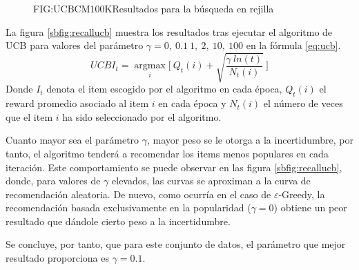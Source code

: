 \begin{figure}[Resultados de la búsqueda en rejilla para UCB]{FIG:UCBCM100K}{Resultados para la búsqueda en rejilla}
   \quad
\end{figure}

La figura \ref{sbfig:recallucb} muestra los resultados tras ejecutar el algoritmo de UCB para valores del parámetro $\gamma = 0, \ 0.1 \ 1, \ 2, \ 10, \ 100$ en la fórmula \ref{eq:ucb}. %
\begin{equation}[eq:ucb]{UCB}
    I_{t} = \underset{i}{\operatorname{argmax}}\Bigg[ \  Q_{t}(i)+\sqrt{\dfrac{\gamma \ ln(t)}{N_{t}(i)}} \ \Bigg]
\end{equation}
Donde $I_{t}$ denota el item escogido por el algoritmo en cada época, $Q_{t}(i)$ el reward promedio asociado al item $i$ en cada época y $N_{t}(i)$ el número de veces que el item $i$ ha sido seleccionado por el algoritmo.

Cuanto mayor sea el parámetro $\gamma$, mayor peso se le otorga a la incertidumbre, por tanto, el algoritmo tenderá a recomendar los items menos populares en cada iteración. Este comportamiento se puede observar en las figura \ref{sbfig:recallucb}, donde, para valores de $\gamma$ elevados, las curvas se aproximan a la curva de recomendación aleatoria. 
De nuevo, como ocurría en el caso de $\varepsilon$-Greedy, la recomendación basada exclusivamente en la popularidad ($\gamma = 0$) obtiene un peor resultado que dándole cierto peso a la incertidumbre. 

Se concluye, por tanto, que para este conjunto de datos, el parámetro que mejor resultado proporciona es $\gamma = 0.1$.